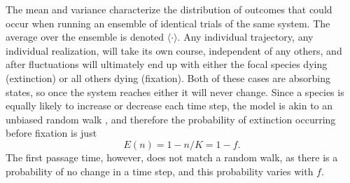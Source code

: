 The mean and variance characterize the distribution of outcomes that could occur when running an ensemble of identical trials of the same system. 
The average over the ensemble is denoted $\langle \cdot \rangle$. 
Any individual trajectory, any individual realization, will take its own course, independent of any others, and after fluctuations will ultimately end up with either the focal species dying (extinction) or all others dying (fixation). 
Both of these cases are absorbing states, so once the system reaches either it will never change.
Since a species is equally likely to increase or decrease each time step, the model is akin to an unbiased random walk \cite{Gardiner2004}, and therefore the probability of extinction occurring before fixation is just
\begin{equation}
E(n) = 1-n/K = 1-f.
\end{equation}
The first passage time, however, does not match a random walk, as there is a probability of no change in a time step, and this probability varies with $f$.

